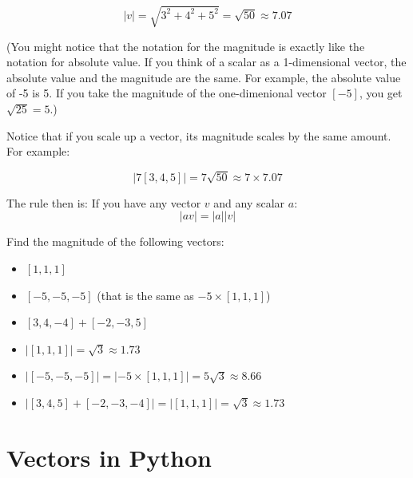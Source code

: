 \begin{equation*}
    |v| = \sqrt{3^2 + 4^2 + 5^2} = \sqrt{50} \approx 7.07
\end{equation*}

(You might notice that the notation for the magnitude is exactly like the notation for absolute value.
If you think of a scalar as a 1-dimensional vector, the absolute value and the magnitude are the same. 
For example, the absolute value of -5 is 5.  If you take the magnitude of the one-dimenional vector $[-5]$,
you get $\sqrt{25} = 5$.)

Notice that if you scale up a vector, its magnitude scales by the same amount. For example:

\begin{equation*}
|7[3,4,5]| = 7 \sqrt{50} \approx 7 \times 7.07    
\end{equation*}

The rule then is: If you have any vector $v$ and any scalar $a$:
\begin{equation*}
    |a v| = |a| |v|
\end{equation*}


\begin{Exercise}[title={Magnitude of a Vector}, label=vector_mag]
    Find the magnitude of the following vectors:
    \begin{itemize}
        \item $[1, 1, 1]$
        \item $[-5, -5, -5]$ (that is the same as $-5 \times [1, 1, 1]$)
        \item $[3, 4, -4] + [-2, -3, 5]$
    \end{itemize}
    \end{Exercise}
    \begin{Answer}[ref=vector_mag]
        \begin{itemize}
            \item $|[1, 1, 1]| = \sqrt{3} \approx 1.73 $
            \item $|[-5, -5, -5]| = |-5 \times [1,1,1]| = 5 \sqrt{3} \approx 8.66$
            \item $|[3, 4, 5] + [-2, -3, -4]| = | [1,1,1] | = \sqrt{3} \approx 1.73$ 
        \end{itemize}
    \end{Answer}

\section{Vectors in Python}

